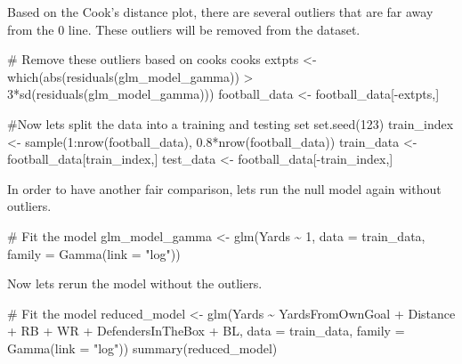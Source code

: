 \documentclass[
  super,
  preprint,
  3p]{elsarticle}
\newenvironment{Shaded}{\begin{snugshade}}{\end{snugshade}}
\newcommand{\AttributeTok}[1]{\textcolor[rgb]{0.40,0.45,0.13}{#1}}
\newcommand{\CommentTok}[1]{\textcolor[rgb]{0.37,0.37,0.37}{#1}}
\newcommand{\DecValTok}[1]{\textcolor[rgb]{0.68,0.00,0.00}{#1}}
\newcommand{\FloatTok}[1]{\textcolor[rgb]{0.68,0.00,0.00}{#1}}
\newcommand{\FunctionTok}[1]{\textcolor[rgb]{0.28,0.35,0.67}{#1}}
\newcommand{\NormalTok}[1]{\textcolor[rgb]{0.00,0.23,0.31}{#1}}
\newcommand{\OtherTok}[1]{\textcolor[rgb]{0.00,0.23,0.31}{#1}}
\newcommand{\SpecialCharTok}[1]{\textcolor[rgb]{0.37,0.37,0.37}{#1}}
\newcommand{\StringTok}[1]{\textcolor[rgb]{0.13,0.47,0.30}{#1}}
\begin{document}
Based on the Cook's distance plot, there are several outliers that are
far away from the 0 line. These outliers will be removed from the
dataset.

\begin{Shaded}
\begin{Highlighting}[]
\CommentTok{\# Remove these outliers based on cooks cooks}
\NormalTok{extpts }\OtherTok{\textless{}{-}} \FunctionTok{which}\NormalTok{(}\FunctionTok{abs}\NormalTok{(}\FunctionTok{residuals}\NormalTok{(glm\_model\_gamma)) }\SpecialCharTok{\textgreater{}} \DecValTok{3}\SpecialCharTok{*}\FunctionTok{sd}\NormalTok{(}\FunctionTok{residuals}\NormalTok{(glm\_model\_gamma)))}
\NormalTok{football\_data }\OtherTok{\textless{}{-}}\NormalTok{ football\_data[}\SpecialCharTok{{-}}\NormalTok{extpts,]}

\CommentTok{\#Now lets split the data into a training and testing set}
\FunctionTok{set.seed}\NormalTok{(}\DecValTok{123}\NormalTok{)}
\NormalTok{train\_index }\OtherTok{\textless{}{-}} \FunctionTok{sample}\NormalTok{(}\DecValTok{1}\SpecialCharTok{:}\FunctionTok{nrow}\NormalTok{(football\_data), }\FloatTok{0.8}\SpecialCharTok{*}\FunctionTok{nrow}\NormalTok{(football\_data))}
\NormalTok{train\_data }\OtherTok{\textless{}{-}}\NormalTok{ football\_data[train\_index,]}
\NormalTok{test\_data }\OtherTok{\textless{}{-}}\NormalTok{ football\_data[}\SpecialCharTok{{-}}\NormalTok{train\_index,]}
\end{Highlighting}
\end{Shaded}

In order to have another fair comparison, lets run the null model again
without outliers.

\begin{Shaded}
\begin{Highlighting}[]
\CommentTok{\# Fit the model}
\NormalTok{glm\_model\_gamma }\OtherTok{\textless{}{-}} \FunctionTok{glm}\NormalTok{(Yards }\SpecialCharTok{\textasciitilde{}} \DecValTok{1}\NormalTok{, }\AttributeTok{data =}\NormalTok{ train\_data, }\AttributeTok{family =} \FunctionTok{Gamma}\NormalTok{(}\AttributeTok{link =} \StringTok{"log"}\NormalTok{))}
\end{Highlighting}
\end{Shaded}

Now lets rerun the model without the outliers.

\begin{Shaded}
\begin{Highlighting}[]
\CommentTok{\# Fit the model}
\NormalTok{reduced\_model }\OtherTok{\textless{}{-}} \FunctionTok{glm}\NormalTok{(Yards }\SpecialCharTok{\textasciitilde{}}\NormalTok{ YardsFromOwnGoal }\SpecialCharTok{+}\NormalTok{ Distance }\SpecialCharTok{+}\NormalTok{ RB }\SpecialCharTok{+}\NormalTok{ WR }\SpecialCharTok{+}\NormalTok{ DefendersInTheBox }\SpecialCharTok{+}\NormalTok{ BL, }\AttributeTok{data =}\NormalTok{ train\_data, }\AttributeTok{family =} \FunctionTok{Gamma}\NormalTok{(}\AttributeTok{link =} \StringTok{"log"}\NormalTok{))}
\FunctionTok{summary}\NormalTok{(reduced\_model)}
\end{Highlighting}
\end{Shaded}
\end{document}
